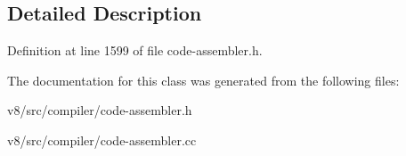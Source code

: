 \subsection{Detailed Description}


Definition at line 1599 of file code-\/assembler.\+h.



The documentation for this class was generated from the following files\+:\begin{DoxyCompactItemize}
\item 
v8/src/compiler/code-\/assembler.\+h\item 
v8/src/compiler/code-\/assembler.\+cc\end{DoxyCompactItemize}
